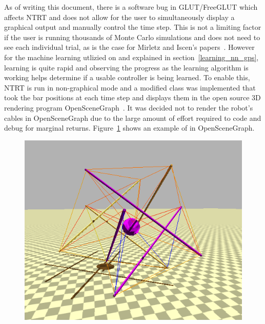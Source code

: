 As of writing this document, there is a software bug in GLUT/FreeGLUT which affects NTRT and does not allow for the user to simultaneously display a graphical output and manually control the time step.
This is not a limiting factor if the user is running thousands of Monte Carlo simulations and does not need to see each individual trial, as is the case for Mirletz and Iscen's papers~\cite{mirletz2015goal, iscen2014flop}.
However for the machine learning utlizied on \SB{} and explained in section~\ref{learning_nn_gps}, learning is quite rapid and observing the progress as the learning algorithm is working helps determine if a usable controller is being learned.
To enable this, NTRT is run in non-graphical mode and a modified class was implemented that took the bar positions at each time step and displays them in the open source 3D rendering program OpenSceneGraph~\cite{osfield2004open}.
It was decided not to render the robot's cables in OpenSceneGraph due to the large amount of effort required to code and debug for marginal returns.
Figure~\ref{fig:OSG_SB} shows an example of \SB{} in OpenSceneGraph.

\begin{figure}[th]
      \centering
      \includegraphics[width=0.8\columnwidth]{tex/img/1.png}
      \caption{}
      \label{fig:OSG_SB}
\end{figure}

